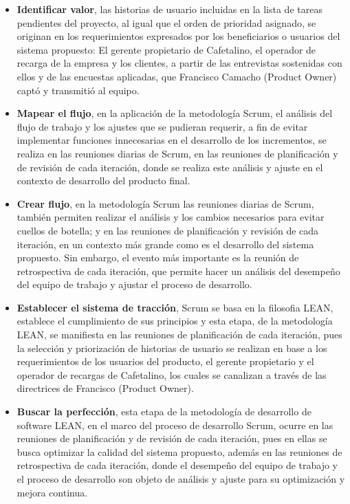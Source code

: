 \begin{itemize}
\item
  \textbf{Identificar valor}, las historias de usuario incluidas en la lista de tareas pendientes del proyecto, al igual que el orden de prioridad asignado, se originan en los requerimientos expresados por los beneficiarios o usuarios del sistema propuesto: El gerente propietario de Cafetalino, el operador de recarga de la empresa y los clientes, a partir de las entrevistas sostenidas con ellos y de las encuestas aplicadas, que Francisco Camacho (Product Owner) captó y transmitió al equipo.
\item
  \textbf{Mapear el flujo}, en la aplicación de la metodología Scrum, el análisis del flujo de trabajo y los ajustes que se pudieran requerir, a fin de evitar implementar funciones innecesarias en el desarrollo de los incrementos, se realiza en las reuniones diarias de Scrum, en las reuniones de planificación y de revisión de cada iteración, donde se realiza este análisis y ajuste en el contexto de desarrollo del producto final.
\item
  \textbf{Crear flujo}, en la metodología Scrum las reuniones diarias de Scrum, también permiten realizar el análisis y los cambios necesarios para evitar cuellos de botella; y en las reuniones de planificación y revisión de cada iteración, en un contexto más grande como es el desarrollo del sistema propuesto. Sin embargo, el evento más importante es la reunión de retrospectiva de cada iteración, que permite hacer un análisis del desempeño del equipo de trabajo y ajustar el proceso de desarrollo.
\item
  \textbf{Establecer el sistema de tracción}, Scrum se basa en la filosofia LEAN, establece el cumplimiento de sus principios y esta etapa, de la metodología LEAN, se manifiesta en las reuniones de planificación de cada iteración, pues la selección y priorización de historias de usuario se realizan en base a los requerimientos de los usuarios del producto, el gerente propietario y el operador de recargas de Cafetalino, los cuales se canalizan a través de las directrices de Francisco (Product Owner).
\item
  \textbf{Buscar la perfección}, esta etapa de la metodología de desarrollo de software LEAN, en el marco del proceso de desarrollo Scrum, ocurre en las reuniones de planificación y de revisión de cada iteración, pues en ellas se busca optimizar la calidad del sistema propuesto, además en las reuniones de retrospectiva de cada iteración, donde el desempeño del equipo de trabajo y el proceso de desarrollo son objeto de análisis y ajuste para su optimización y mejora continua.
\end{itemize}


